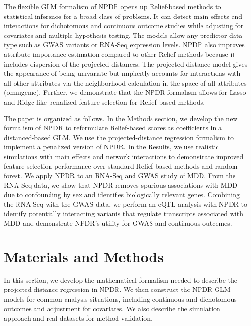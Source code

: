 \documentclass{bioinfo}
\begin{document}
The flexible GLM formalism of NPDR opens up Relief-based methods to statistical inference for a broad class of problems.
It can detect main effects and interactions for dichotomous and continuous outcome studies while adjusting for covariates and multiple hypothesis testing.
The models allow any predictor data type such as GWAS variants or RNA-Seq expression levels.
NPDR also improves attribute importance estimation compared to other Relief methods because it includes dispersion of the projected distances.
The projected distance model gives the appearance of being univariate but implicitly accounts for interactions with all other attributes via the neighborhood calculation in the space of all attributes (omnigenic).
Further, we demonstrate that the NPDR formalism allows for Lasso and Ridge-like penalized feature selection for Relief-based methods.

The paper is organized as follows.
In the Methods section, we develop the new formalism of NPDR to reformulate Relief-based scores as coefficients in a distanced-based GLM.
We use the projected-distance regression formalism to implement a penalized version of NPDR.
In the Results, we use realistic simulations with main effects and network interactions to demonstrate improved feature selection performance over standard Relief-based methods and random forest.
We apply NPDR to an RNA-Seq and GWAS study of MDD.
From the RNA-Seq data, we show that NPDR removes spurious associations with MDD due to confounding by sex and identifies biologically relevant genes.
Combining the RNA-Seq with the GWAS data, we perform an eQTL analysis with NPDR to identify potentially interacting variants that regulate transcripts associated with MDD and demonstrate NPDR's utility for GWAS and continuous outcomes.



\section{Materials and Methods}
In this section, we develop the mathematical formalism needed to describe the projected distance regression in NPDR.
We then construct the NPDR GLM models for common analysis situations, including continuous and dichotomous outcomes and adjustment for covariates.
We also describe the simulation approach and real datasets for method validation.
\end{document}
